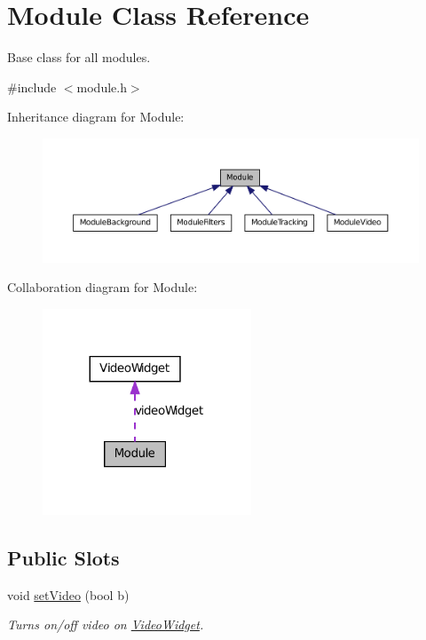 \hypertarget{class_module}{
\section{Module Class Reference}
\label{dd/df9/class_module}
}


Base class for all modules.  




{\ttfamily \#include $<$module.h$>$}



Inheritance diagram for Module:\nopagebreak
\begin{figure}[H]
\begin{center}
\leavevmode
\includegraphics[width=400pt]{d1/d4b/class_module__inherit__graph}
\end{center}
\end{figure}


Collaboration diagram for Module:\nopagebreak
\begin{figure}[H]
\begin{center}
\leavevmode
\includegraphics[width=176pt]{d0/d57/class_module__coll__graph}
\end{center}
\end{figure}
\subsection*{Public Slots}
\begin{DoxyCompactItemize}
\item 
void \hyperlink{class_module_a9f09b6299ae8bfc21733173faa7ff6e7}{setVideo} (bool b)
\begin{DoxyCompactList}\small\item\em Turns on/off video on \hyperlink{class_video_widget}{VideoWidget}. \item\end{DoxyCompactList}\end{DoxyCompactItemize}
